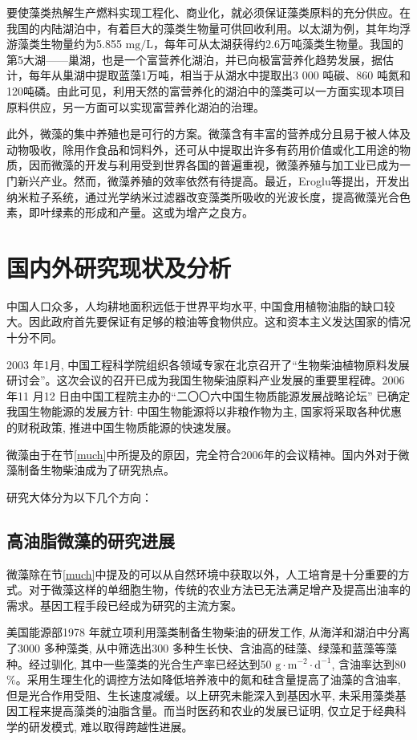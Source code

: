 \documentclass[a4paper,12pt]{report}
\begin{document}
要使藻类热解生产燃料实现工程化、商业化，就必须保证藻类原料的充分供应。在我国的内陆湖泊中，有着巨大的藻类生物量可供回收利用。以太湖为例，其年均浮游藻类生物量约为5.855 $\mathrm{mg/L}$，每年可从太湖获得约2.6万吨藻类生物量。我国的第5大湖——巢湖，也是一个富营养化湖泊，并已向极富营养化趋势发展，据估计，每年从巢湖中提取蓝藻1万吨，相当于从湖水中提取出3 000 吨碳、860 吨氮和120吨磷。由此可见，利用天然的富营养化的湖泊中的藻类可以一方面实现本项目原料供应，另一方面可以实现富营养化湖泊的治理。\cite{Miao2003}

此外，微藻的集中养殖也是可行的方案。微藻含有丰富的营养成分且易于被人体及动物吸收，除用作食品和饲料外，还可从中提取出许多有药用价值或化工用途的物质，因而微藻的开发与利用受到世界各国的普遍重视，微藻养殖与加工业已成为一门新兴产业。然而，微藻养殖的效率依然有待提高。\cite{Miao2003}最近，Eroglu等提出，开发出纳米粒子系统，通过光学纳米过滤器改变藻类所吸收的光波长度，提高微藻光合色素，即叶绿素的形成和产量。\cite{Eroglu2013}这或为增产之良方。


\chapter{国内外研究现状及分析}


中国人口众多，人均耕地面积远低于世界平均水平, 中国食用植物油脂的缺口较大。因此政府首先要保证有足够的粮油等食物供应。这和资本主义发达国家的情况十分不同。\cite{Song2008}

2003 年1月, 中国工程科学院组织各领域专家在北京召开了“生物柴油植物原料发展研讨会”。这次会议的召开已成为我国生物柴油原料产业发展的重要里程碑。2006 年11 月12 日由中国工程院主办的“二〇〇六中国生物质能源发展战略论坛” 已确定我国生物能源的发展方针: 中国生物能源将以非粮作物为主, 国家将采取各种优惠的财税政策, 推进中国生物质能源的快速发展。\cite{Song2008}

微藻由于在节\ref{much}中所提及的原因，完全符合2006年的会议精神。国内外对于微藻制备生物柴油成为了研究热点。

研究大体分为以下几个方向：

\section{高油脂微藻的研究进展}

微藻除在节\ref{much}中提及的可以从自然环境中获取以外，人工培育是十分重要的方式。对于微藻这样的单细胞生物，传统的农业方法已无法满足增产及提高出油率的需求。基因工程手段已经成为研究的主流方案。

美国能源部1978 年就立项利用藻类制备生物柴油的研发工作, 从海洋和湖泊中分离了3000 多种藻类, 从中筛选出300 多种生长快、含油高的硅藻、绿藻和蓝藻等藻种。经过驯化, 其中一些藻类的光合生产率已经达到50 $\mathrm{g\cdot m^{−2}\cdot d^{−1}}$, 含油率达到80$\%$\cite{FB1996,Schenk2008}。采用生理生化的调控方法如降低培养液中的氮和硅含量提高了油藻的含油率, 但是光合作用受阻、生长速度减缓。以上研究未能深入到基因水平, 未采用藻类基因工程来提高藻类的油脂含量。而当时医药和农业的发展已证明, 仅立足于经典科学的研发模式, 难以取得跨越性进展。\cite{Song2008}
\end{document}

